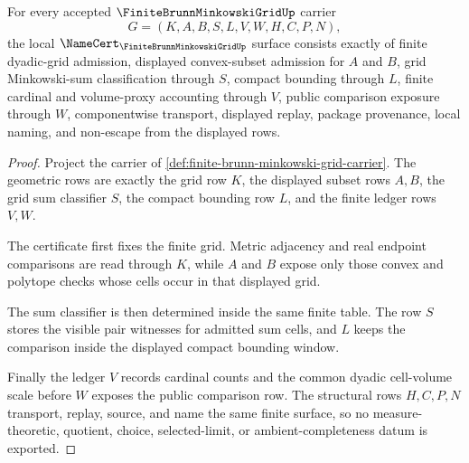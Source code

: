 \begin{theorem}
\label{thm:finite-brunn-minkowski-grid-namecert-obligations}
For every accepted $\FiniteBrunnMinkowskiGridUp$ carrier
$$
G=(K,A,B,S,L,V,W,H,C,P,N),
$$
the local $\NameCert_{\FiniteBrunnMinkowskiGridUp}$ surface consists exactly of finite dyadic-grid admission, displayed convex-subset admission for $A$ and $B$, grid Minkowski-sum classification through $S$, compact bounding through $L$, finite cardinal and volume-proxy accounting through $V$, public comparison exposure through $W$, componentwise transport, displayed replay, package provenance, local naming, and non-escape from the displayed rows.
\end{theorem}
\begin{proof}
Project the carrier of \autoref{def:finite-brunn-minkowski-grid-carrier}. The geometric rows are exactly the grid row $K$, the displayed subset rows $A,B$, the grid sum classifier $S$, the compact bounding row $L$, and the finite ledger rows $V,W$.

The certificate first fixes the finite grid. Metric adjacency and real endpoint comparisons are read through $K$, while $A$ and $B$ expose only those convex and polytope checks whose cells occur in that displayed grid.

The sum classifier is then determined inside the same finite table. The row $S$ stores the visible pair witnesses for admitted sum cells, and $L$ keeps the comparison inside the displayed compact bounding window.

Finally the ledger $V$ records cardinal counts and the common dyadic cell-volume scale before $W$ exposes the public comparison row. The structural rows $H,C,P,N$ transport, replay, source, and name the same finite surface, so no measure-theoretic, quotient, choice, selected-limit, or ambient-completeness datum is exported.
\end{proof}

